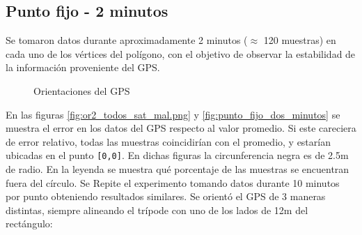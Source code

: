 \documentclass[main]{subfiles}
\begin{document}
\subsection{Punto fijo - 2 minutos}
\label{sec:gps2-punto-fijo-2-minutos}

Se tomaron datos durante aproximadamente 2 minutos ($\approx$ 120 muestras) en cada uno de los vértices del polígono, con el objetivo de observar la estabilidad de la información proveniente del GPS.

\begin{figure}
\vspace{-10pt}
  \centering
\vspace{-10pt}
\caption{Orientaciones del GPS}
\vspace{-20pt}
\end{figure}

En las figuras \ref{fig:or2_todos_sat_mal.png} y \ref{fig:punto_fijo_dos_minutos} se muestra el error en los datos del GPS respecto al valor promedio. Si este careciera de error relativo, todas las muestras coincidirían con el promedio, y estarían ubicadas en el punto \verb+[0,0]+. En dichas figuras la circunferencia negra es de 2.5m de radio. En la leyenda se muestra qué porcentaje de las muestras se encuentran fuera del círculo. Se Repite el experimento tomando datos durante 10 minutos por punto obteniendo resultados similares. Se orientó el GPS de 3 maneras distintas, siempre alineando el trípode con uno de los lados de 12m del rectángulo:
\end{document}
